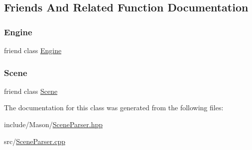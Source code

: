 \subsection{Friends And Related Function Documentation}
\hypertarget{class_mason_1_1_scene_parser_a3e1914489e4bed4f9f23cdeab34a43dc}{}\label{class_mason_1_1_scene_parser_a3e1914489e4bed4f9f23cdeab34a43dc} 
\subsubsection{\texorpdfstring{Engine}{Engine}}
{\footnotesize\ttfamily friend class \hyperlink{class_mason_1_1_engine}{Engine}\hspace{0.3cm}{\ttfamily [friend]}}

\hypertarget{class_mason_1_1_scene_parser_a032858ae1fe02d2d1170981c2af2d67c}{}\label{class_mason_1_1_scene_parser_a032858ae1fe02d2d1170981c2af2d67c} 
\subsubsection{\texorpdfstring{Scene}{Scene}}
{\footnotesize\ttfamily friend class \hyperlink{class_mason_1_1_scene}{Scene}\hspace{0.3cm}{\ttfamily [friend]}}



The documentation for this class was generated from the following files\+:\begin{DoxyCompactItemize}
\item 
include/\+Mason/\hyperlink{_scene_parser_8hpp}{Scene\+Parser.\+hpp}\item 
src/\hyperlink{_scene_parser_8cpp}{Scene\+Parser.\+cpp}\end{DoxyCompactItemize}
